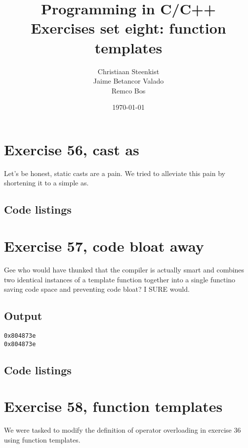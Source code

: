 \documentclass[11pt]{article}
\begin{document}
\title{Programming in C/C++ \\
       Exercises set eight: function templates
}
\date{\today}
\author{Christiaan Steenkist \\
Jaime Betancor Valado \\
Remco Bos \\
}

\maketitle
\section*{Exercise 56, cast as}
Let's be honest, static casts are a pain.
We tried to alleviate this pain by shortening it to a simple as.

\subsection*{Code listings}




\section*{Exercise 57, code bloat away}
Gee who would have thunked that the compiler is actually smart and combines two identical instances of a template function together into a single functino saving code space and preventing code bloat? I SURE would.

\subsection*{Output}
\begin{lstlisting}
0x804873e
0x804873e
\end{lstlisting}

\subsection*{Code listings}






\section*{Exercise 58, function templates}
We were tasked to modify the definition of operator overloading in exercise 36 using function templates.
\end{document}
